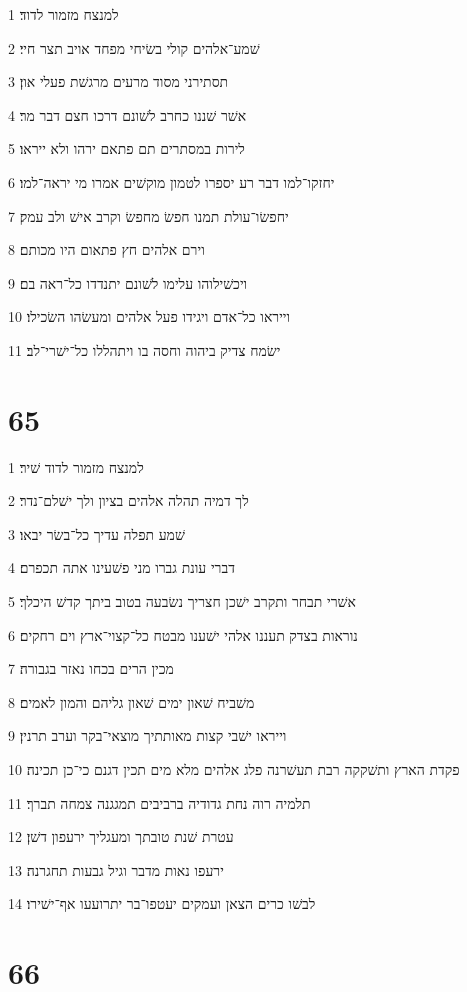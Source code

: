 \par 1 למנצח מזמור לדוד׃
\par 2 שׁמע־אלהים קולי בשׂיחי מפחד אויב תצר חיי׃
\par 3 תסתירני מסוד מרעים מרגשׁת פעלי און׃
\par 4 אשׁר שׁננו כחרב לשׁונם דרכו חצם דבר מר׃
\par 5 לירות במסתרים תם פתאם ירהו ולא ייראו׃
\par 6 יחזקו־למו דבר רע יספרו לטמון מוקשׁים אמרו מי יראה־למו׃
\par 7 יחפשׂו־עולת תמנו חפשׂ מחפשׂ וקרב אישׁ ולב עמק׃
\par 8 וירם אלהים חץ פתאום היו מכותם׃
\par 9 ויכשׁילוהו עלימו לשׁונם יתנדדו כל־ראה בם׃
\par 10 וייראו כל־אדם ויגידו פעל אלהים ומעשׂהו השׂכילו׃
\par 11 ישׂמח צדיק ביהוה וחסה בו ויתהללו כל־ישׁרי־לב׃

\chapter{65}

\par 1 למנצח מזמור לדוד שׁיר׃
\par 2 לך דמיה תהלה אלהים בציון ולך ישׁלם־נדר׃
\par 3 שׁמע תפלה עדיך כל־בשׂר יבאו׃
\par 4 דברי עונת גברו מני פשׁעינו אתה תכפרם׃
\par 5 אשׁרי תבחר ותקרב ישׁכן חצריך נשׂבעה בטוב ביתך קדשׁ היכלך׃
\par 6 נוראות בצדק תעננו אלהי ישׁענו מבטח כל־קצוי־ארץ וים רחקים׃
\par 7 מכין הרים בכחו נאזר בגבורה׃
\par 8 משׁביח שׁאון ימים שׁאון גליהם והמון לאמים׃
\par 9 וייראו ישׁבי קצות מאותתיך מוצאי־בקר וערב תרנין׃
\par 10 פקדת הארץ ותשׁקקה רבת תעשׁרנה פלג אלהים מלא מים תכין דגנם כי־כן תכינה׃
\par 11 תלמיה רוה נחת גדודיה ברביבים תמגגנה צמחה תברך׃
\par 12 עטרת שׁנת טובתך ומעגליך ירעפון דשׁן׃
\par 13 ירעפו נאות מדבר וגיל גבעות תחגרנה׃
\par 14 לבשׁו כרים הצאן ועמקים יעטפו־בר יתרועעו אף־ישׁירו׃

\chapter{66}

